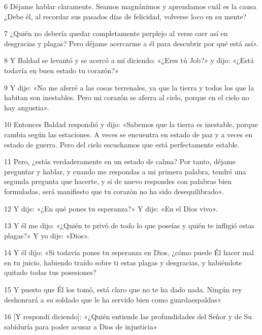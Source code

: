 \par 6 Déjame hablar claramente. Seamos magnánimos y aprendamos cuál es la causa ¿Debe él, al recordar sus pasados ​​días de felicidad, volverse loco en su mente?

\par 7 ¿Quién no debería quedar completamente perplejo al verse caer así en desgracias y plagas? Pero déjame acercarme a él para descubrir por qué está así».

\par 8 Y Baldad se levantó y se acercó a mí diciendo: «¿Eres tú Job?» y dijo: «¿Está todavía en buen estado tu corazón?»

\par 9 Y dije: «No me aferré a las cosas terrenales, ya que la tierra y todos los que la habitan son inestables. Pero mi corazón se aferra al cielo, porque en el cielo no hay angustia».

\par 10 Entonces Baldad respondió y dijo: «Sabemos que la tierra es inestable, porque cambia según las estaciones. A veces se encuentra en estado de paz y a veces en estado de guerra. Pero del cielo escuchamos que está perfectamente estable.

\par 11 Pero, ¿estás verdaderamente en un estado de calma? Por tanto, déjame preguntar y hablar, y cuando me respondas a mi primera palabra, tendré una segunda pregunta que hacerte, y si de nuevo respondes con palabras bien formuladas, será manifiesto que tu corazón no ha sido desequilibrado».

\par 12 Y dije: «¿En qué pones tu esperanza?» Y dije: «En el Dios vivo».

\par 13 Y él me dijo: «¿Quién te privó de todo lo que poseías y quién te infligió estas plagas?» Y yo dije: «Dios».

\par 14 Y él dijo: «Si todavía pones tu esperanza en Dios, ¿cómo puede Él hacer mal en tu juicio, habiendo traído sobre ti estas plagas y desgracias, y habiéndote quitado todas tus posesiones?

\par 15 Y puesto que Él los tomó, está claro que no te ha dado nada. Ningún rey deshonrará a su soldado que le ha servido bien como guardaespaldas»

\par 16 [Y respondí diciendo]: «¿Quién entiende las profundidades del Señor y de Su sabiduría para poder acusar a Dios de injusticia»

